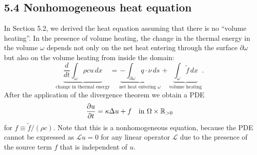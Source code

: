 \subsection{5.4 Nonhomogeneous heat equation}
In Section 5.2, we derived the heat equation assuming that there is no ``volume heating''. In the presence of volume heating, the change in the thermal energy in the volume $\omega$ depends not only on the net heat entering through the surface $\partial\omega$ but also on the volume heating from inside the domain:
\[\underbrace{\frac{d}{dt} \int_\omega \rho c u\,dx}_{\text{change in thermal energy}} = \underbrace{-\int_{\partial\omega} q \cdot \nu\,ds}_{\text{net heat entering } \omega} + \underbrace{\int_\omega \tilde{f}\,dx}_{\text{volume heating}}.\]
After the application of the divergence theorem we obtain a PDE
\[\frac{\partial u}{\partial t} = \kappa \Delta u + f \quad \text{in } \Omega \times \mathbb{R}_{>0}\]
for $f \equiv \tilde{f}/(\rho c)$. Note that this is a nonhomogeneous equation, because the PDE cannot be expressed as $\mathcal{L} u = 0$ for any linear operator $\mathcal{L}$ due to the presence of the source term $f$ that is independent of $u$.

